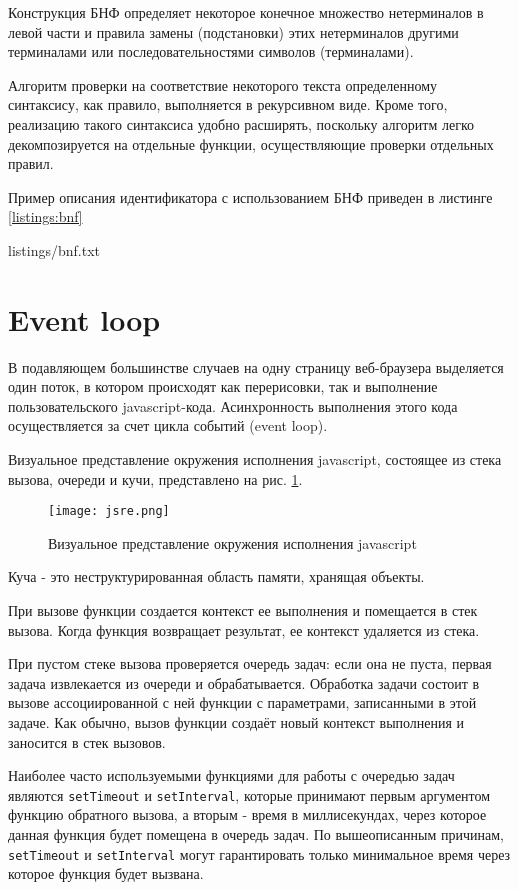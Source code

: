 Конструкция БНФ определяет некоторое конечное множество нетерминалов в левой части и правила замены (подстановки) этих нетерминалов другими терминалами или последовательностями символов (терминалами).

Алгоритм проверки на соответствие некоторого текста определенному синтаксису, как правило, выполняется в рекурсивном виде. Кроме того, реализацию такого синтаксиса удобно расширять, поскольку алгоритм легко декомпозируется на отдельные функции, осуществляющие проверки отдельных правил.

Пример описания идентификатора с использованием БНФ приведен в листинге \ref{listings:bnf}


{listings/bnf.txt}

\section{Event loop}
В подавляющем большинстве случаев на одну страницу веб-браузера выделяется один поток, в котором происходят как перерисовки, так и выполнение пользовательского javascript-кода. Асинхронность выполнения этого кода осуществляется за счет цикла событий (event loop).

Визуальное представление окружения исполнения javascript, состоящее из стека вызова, очереди и кучи, представлено на рис. \ref{fig:jsre}.

\begin{figure}[htbp]
	\centering
	\texttt{[image: jsre.png]}
	\caption{Визуальное представление окружения исполнения javascript}%
	\label{fig:jsre}
\end{figure}

Куча - это неструктурированная область памяти, хранящая объекты.

При вызове функции создается контекст ее выполнения и помещается в стек вызова. Когда функция возвращает результат, ее контекст удаляется из стека.

При пустом стеке вызова проверяется очередь задач: если она не пуста, первая задача извлекается из очереди и обрабатывается. Обработка задачи состоит в вызове  ассоциированной с ней функции с параметрами, записанными в этой задаче. Как обычно, вызов функции создаёт новый контекст выполнения и заносится в стек вызовов. \cite{mdn-el}

Наиболее часто используемыми функциями для работы с очередью задач являются \lstinline|setTimeout| и \lstinline|setInterval|, которые принимают первым аргументом функцию обратного вызова, а вторым - время в миллисекундах, через которое данная функция будет помещена в очередь задач. По вышеописанным причинам, \lstinline|setTimeout| и \lstinline|setInterval| могут гарантировать только минимальное время через которое функция будет вызвана.



